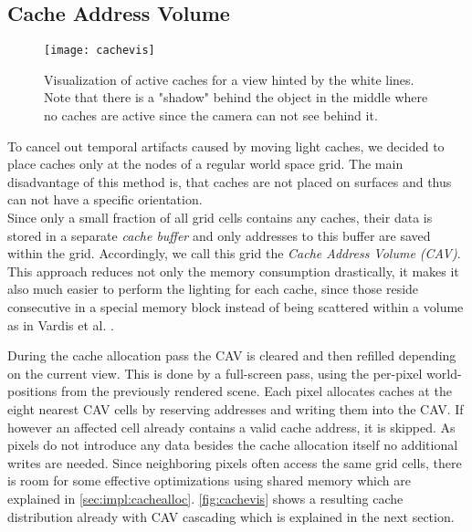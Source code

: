 \documentclass[thesis.tex]{subfiles}
\begin{document}
\subsection{Cache Address Volume}
\begin{figure}[h]
	\centering
	\texttt{[image: cachevis]}
	\caption{Visualization of active caches for a view hinted by the white lines. Note that there is a "shadow" behind the object in the middle where no caches are active since the camera can not see behind it.} \label{fig:cachevis}
\end{figure}
To cancel out temporal artifacts caused by moving light caches, we decided to place caches only at the nodes of a regular world space grid.
The main disadvantage of this method is, that caches are not placed on surfaces and thus can not have a specific orientation.\\
Since only a small fraction of all grid cells contains any caches, their data is stored in a separate \emph{cache buffer} and only addresses to this buffer are saved within the grid.
Accordingly, we call this grid the \emph{Cache Address Volume (CAV)}.
This approach reduces not only the memory consumption drastically, it makes it also much easier to perform the lighting for each cache, since those reside consecutive in a special memory block instead of being scattered within a volume as in Vardis et al. \cite{bib:radiancecachechromaticcompression}.

During the cache allocation pass the CAV is cleared and then refilled depending on the current view.
This is done by a full-screen pass, using the per-pixel world-positions from the previously rendered scene. %
Each pixel allocates caches at the eight nearest CAV cells by reserving addresses and writing them into the CAV.
If however an affected cell already contains a valid cache address, it is skipped.
As pixels do not introduce any data besides the cache allocation itself no additional writes are needed.
Since neighboring pixels often access the same grid cells, there is room for some effective optimizations using shared memory which are explained in \autoref{sec:impl:cachealloc}.
\autoref{fig:cachevis} shows a resulting cache distribution already with CAV cascading which is explained in the next section.
\end{document}
